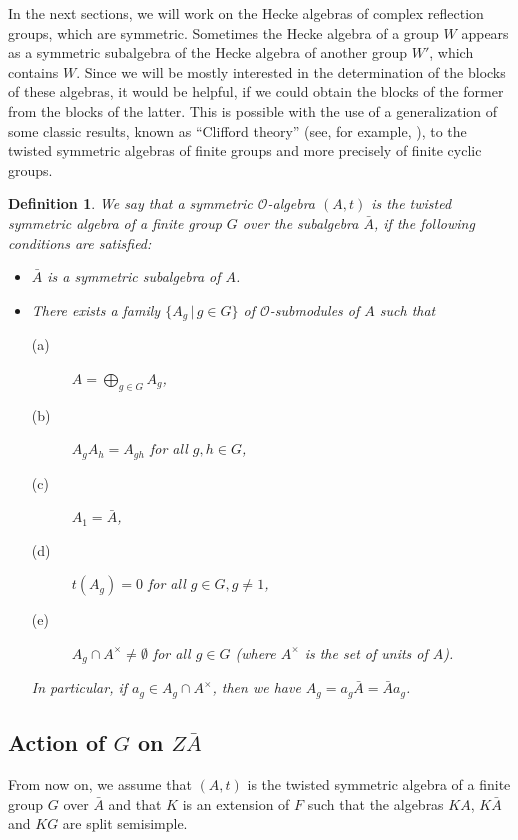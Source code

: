 \documentclass[10pt,a4paper,titlepage]{article}
\newtheorem{definition}[theorem]{Definition}
\begin{document}
In the next sections, we will work on the Hecke algebras of complex
reflection groups, which are symmetric.
Sometimes the Hecke algebra of a group $W$ appears as a symmetric
subalgebra of the Hecke algebra of another group $W'$, which
contains $W$. Since we will be mostly interested in the
determination of the blocks of these algebras, it would be helpful,
if we could obtain the blocks of the former from the blocks of the
latter. This is possible with the use of a generalization of some
classic results, known as ``Clifford theory'' (see, for example,
\cite{Da}), to the twisted symmetric algebras of finite groups and
more precisely of finite cyclic groups. 

\begin{definition}\label{symmetric algebra of a finite group}
We say that a symmetric $\mathcal{O}$-algebra $(A,t)$ is the twisted
symmetric algebra of a finite group $G$ over the subalgebra
$\bar{A}$, if the following conditions are satisfied:
\begin{itemize}
  \item $\bar{A}$ is a symmetric subalgebra of $A$.
  \item There exists a family $\{A_g \,|\, g \in G\}$ of
  $\mathcal{O}$-submodules of $A$ such that
  \begin{description}
    \item[(a)] $A= \bigoplus_{g \in G}A_g$,
    \item[(b)] $A_gA_h=A_{gh}$ for all $g,h \in G$,
    \item[(c)] $A_1=\bar{A}$,
    \item[(d)] $t(A_g)=0$ for all $g \in G, g \neq  1$,
    \item[(e)] $A_g \cap A^\times \neq \emptyset$ for all $g \in G$ (where
    $A^\times$ is the set of units of $A$).
     \end{description}
    In particular, if $a_g \in A_g \cap A^\times$, then we have $A_g=a_g\bar{A}=\bar{A}a_g$.
\end{itemize}
\end{definition}

\subsection*{\normalsize Action of $G$ on $Z\bar{A}$}

From now on, we assume that $(A,t)$ is the twisted
symmetric algebra of a finite group $G$ over
$\bar{A}$ and that $K$ is an extension of $F$ such that
the algebras $KA$, $K\bar{A}$ and $KG$ are split semisimple.
\end{document}
